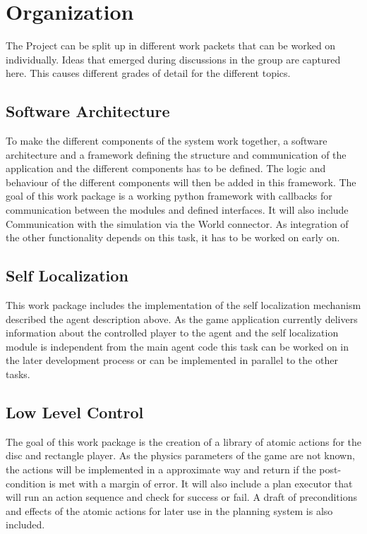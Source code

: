 \documentclass{article}
\begin{document}
\section{Organization}

The Project can be split up in different work packets that can be worked on individually.
Ideas that emerged during discussions in the group are captured here. This causes different grades of detail for the different topics.

\subsection{Software Architecture}
To make the different components of the system work together, a software architecture and a framework defining the structure and communication of the application and the different components has to be defined. 
The logic and behaviour of the different components will then be added in this framework. 
The goal of this work package is a working python framework with callbacks for communication between the modules and defined interfaces. 
It will also include Communication with the simulation via the World connector.
As integration of the other functionality depends on this task, it has to be worked on early on.

\subsection{Self Localization}

This work package includes the implementation of the self localization mechanism described the agent description above. As the game application currently delivers information about the controlled player to the agent and the self localization module is independent from the main agent code this task can be worked on in the later development process or can be implemented in parallel to the other tasks. 

\subsection{Low Level Control}
The goal of this work package is the creation of a library of atomic actions for the disc and rectangle player. 
As the physics parameters of the game are not known, the actions will be implemented in a approximate way and return if the post-condition is met with a margin of error. 
It will also include a plan executor that will run an action sequence and check for success or fail.
A draft of preconditions and effects of the atomic actions for later use in the planning system is also included.
\end{document}
